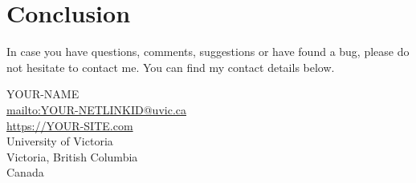 \chapter{Conclusion}\label{ch:conclusion}
In case you have questions, comments, suggestions or have found a bug, please do not hesitate to contact me. You can find my contact details below.
  \begin{center}
    YOUR-NAME\\
    \href{mailto: YOUR-NETLINKID@uvic.ca}{mailto:YOUR-NETLINKID@uvic.ca}\\
    \href{https://YOUR-SITE.com}{https://YOUR-SITE.com}\\
    University of Victoria\\
    Victoria, British Columbia\\
    Canada
  \end{center}

